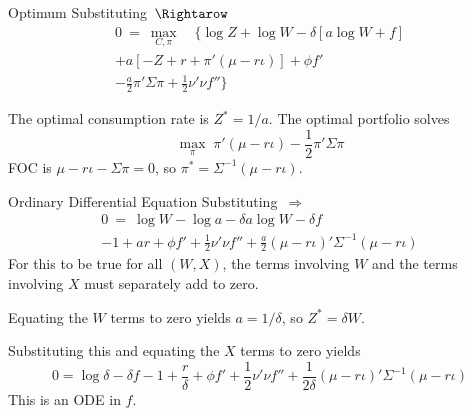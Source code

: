 \documentclass[xcolor=dvipsnames,10pt]{beamer}
\begin{document}
\begin{frame}{Optimum}
Substituting $\,\Rightarow$
\begin{multline*} 0 \ = \ \max_{C,\pi} \quad \bigg\{\log Z + \log W - \delta [a \log W + f] \\ + a[-Z + r + \pi'(\mu - r\iota)] + \phi f'\\ 
- \frac{a}{2}\pi'\Sigma\pi  + \frac{1}{2}\nu'\nu f'' \bigg\}
\end{multline*}

The optimal consumption rate is $Z^*=1/a$.  The optimal portfolio solves
$$\max_\pi \; \pi'(\mu-r\iota) - \frac{1}{2}\pi'\Sigma\pi$$
FOC is $\mu-r\iota - \Sigma\pi=0$, so $\pi^* = \Sigma^{-1}(\mu-r\iota)$.

\end{frame}

\begin{frame}{Ordinary Differential Equation}
Substituting $\,\Rightarrow$
\begin{multline*} 0 \ = \ \log W - \log a - \delta a \log W - \delta f \\ 
-1 + ar + \phi f' + \frac{1}{2}\nu'\nu f'' +
 \frac{a}{2}(\mu - r\iota)'\Sigma^{-1}(\mu - r\iota) 
\end{multline*}
For this to be true for all $(W,X)$, the terms involving $W$ and the terms involving $X$ must separately add to zero.  

Equating the $W$ terms to zero yields $a = 1/\delta$, so $Z^* = \delta W$.  

Substituting this and equating the $X$ terms to zero yields
$$ 0= \log \delta - \delta f - 1 + \frac{r}{\delta} + \phi f' +  \frac{1}{2}\nu'\nu f'' +
 \frac{1}{2\delta}(\mu - r\iota)'\Sigma^{-1}(\mu - r\iota) 
$$
This is an ODE in $f$.
\end{frame}
\end{document}
